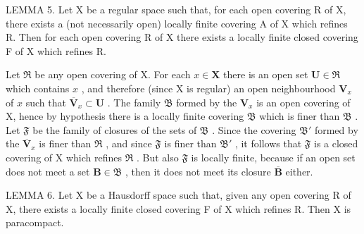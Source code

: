 LEMMA 5. Let X be a regular space such that, for each open covering R of X, there exists a (not necessarily open) locally finite covering A of X which refines R. Then for each open covering R of X there exists a locally finite closed covering F of X which refines R.

Let \(\mathfrak{R}\) be any open covering of X. For each \(x \in \mathbf{X}\) there is an open set \(\mathbf{U} \in \mathfrak{R}\) which contains \(x\) , and therefore (since X is regular) an open neighbourhood \(\mathbf{V}_x\) of \(x\) such that \(\overline{\mathbf{V}}_x \subset \mathbf{U}\) . The family \(\mathfrak{B}\) formed by the \(\mathbf{V}_x\) is an open covering of X, hence by hypothesis there is a locally finite covering \(\mathfrak{B}\) which is finer than \(\mathfrak{B}\) . Let \(\mathfrak{F}\) be the family of closures of the sets of \(\mathfrak{B}\) . Since the covering \(\mathfrak{B}'\) formed by the \(\overline{\mathbf{V}}_x\) is finer than \(\mathfrak{R}\) , and since \(\mathfrak{F}\) is finer than \(\mathfrak{B}'\) , it follows that \(\mathfrak{F}\) is a closed covering of X which refines \(\mathfrak{R}\) . But also \(\mathfrak{F}\) is locally finite, because if an open set does not meet a set \(\mathbf{B} \in \mathfrak{B}\) , then it does not meet its closure \(\overline{\mathbf{B}}\) either.

LEMMA 6. Let X be a Hausdorff space such that, given any open covering R of X, there exists a locally finite closed covering F of X which refines R. Then X is paracompact.

